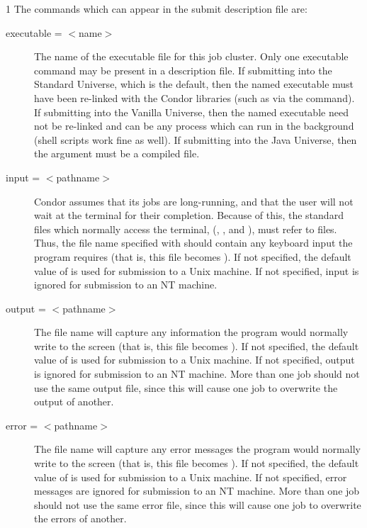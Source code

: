 \begin{ManPage}{\label{man-condor-submit}}{1}
The commands which can appear in the submit description file are:

\begin{description} 


\item[executable = $<$name$>$]The name of the executable file for this
job cluster. Only one executable command may be present in a description
file. If submitting into the Standard Universe, which is the default,
then the named executable must have been re-linked with the Condor
libraries (such as via the  command). If submitting into
the Vanilla Universe, then the named executable need not be re-linked and
can be any process which can run in the background (shell scripts work
fine as well).  If submitting into the Java Universe, then the argument
must be a compiled  file.



\item[input = $<$pathname$>$] Condor assumes that its jobs are
long-running, and that the user will not wait at the terminal for their
completion. Because of this, the standard files which normally access
the terminal, (, , and ),
must refer to files. Thus,
the file name specified with  should contain any keyboard
input the program requires (that is, this file becomes ).
If not specified, the default value
of  is used for submission to a Unix machine.
If not specified, input is ignored
for submission to an NT machine.


\item[output = $<$pathname$>$] The  file name will capture
any information the program would normally write to the screen
(that is, this file becomes ).
If not specified, the default value of
 is used for submission to a Unix machine.
If not specified, output is ignored
for submission to an NT machine.
More than one job should not use the same output
file, since this will cause one job to overwrite the output of
another.


\item[error = $<$pathname$>$] The  file name will capture any
error messages the program would normally write to the screen
(that is, this file becomes ).
If not specified, the default value of
 is used for submission to a Unix machine.
If not specified, error messages are ignored
for submission to an NT machine.
More than one job should not use the same error file, since
this will cause one job to overwrite the errors of another.


\end{description}
\end{ManPage}

